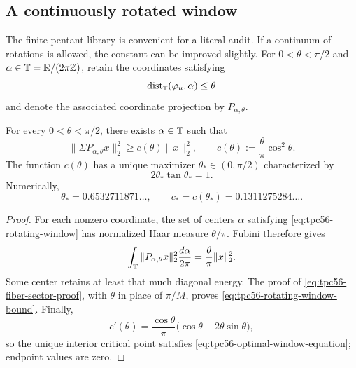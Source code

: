 \subsection{A continuously rotated window}

The finite pentant library is convenient for a literal audit.  If a
continuum of rotations is allowed, the constant can be improved slightly.
For \(0<\theta<\pi/2\) and \(\alpha\in\mathbb T=\mathbb R/(2\pi\mathbb Z)\), retain the
coordinates satisfying
\begin{equation}
 \operatorname{dist}_{\mathbb T}(\varphi_u,\alpha)\le\theta
 \label{eq:tpc56-rotating-window}
\end{equation}
and denote the associated coordinate projection by \(P_{\alpha,\theta}\).

\begin{theorem}
\label{thm:tpc56-rotating-window}
For every \(0<\theta<\pi/2\), there exists \(\alpha\in\mathbb T\) such that
\begin{equation}
 \|\Sigma P_{\alpha,\theta}x\|_2^2
 \ge c(\theta)\|x\|_2^2,
 \qquad
 c(\theta):=\frac\theta\pi\cos^2\theta.
 \label{eq:tpc56-rotating-window-bound}
\end{equation}
The function \(c(\theta)\) has a unique maximizer
\(\theta_*\in(0,\pi/2)\) characterized by
\begin{equation}
 2\theta_*\tan\theta_*=1.
 \label{eq:tpc56-optimal-window-equation}
\end{equation}
Numerically,
\begin{equation}
 \theta_*=0.6532711871\ldots,
 \qquad
 c_*=c(\theta_*)=0.1311275284\ldots .
 \label{eq:tpc56-optimal-window-constant}
\end{equation}
\end{theorem}

\begin{proof}
For each nonzero coordinate, the set of centers \(\alpha\) satisfying
\eqref{eq:tpc56-rotating-window} has normalized Haar measure
\(\theta/\pi\).  Fubini therefore gives
\begin{equation}
 \int_{\mathbb T}\|P_{\alpha,\theta}x\|_2^2
 \frac{d\alpha}{2\pi}
 =\frac\theta\pi\|x\|_2^2.
 \label{eq:tpc56-window-average-energy}
\end{equation}
Some center retains at least that much diagonal energy.  The proof of
\eqref{eq:tpc56-fiber-sector-proof}, with \(\theta\) in place of
\(\pi/M\), proves \eqref{eq:tpc56-rotating-window-bound}.  Finally,
\begin{equation}
 c'(\theta)=\frac{\cos\theta}{\pi}
 \bigl(\cos\theta-2\theta\sin\theta\bigr),
 \label{eq:tpc56-window-derivative}
\end{equation}
so the unique interior critical point satisfies
\eqref{eq:tpc56-optimal-window-equation}; endpoint values are zero.
\end{proof}


